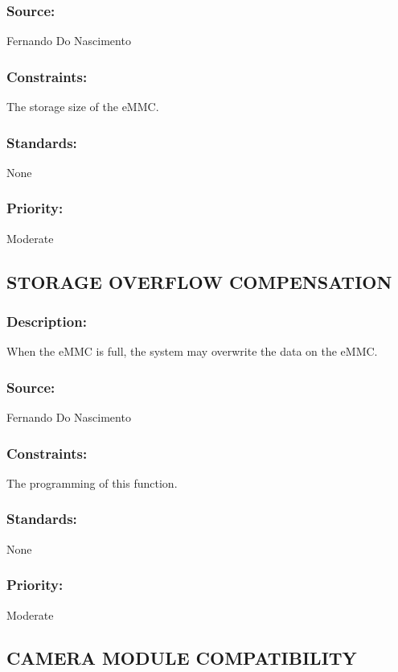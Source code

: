 \subsubsection{Source:} 
	{Fernando Do Nascimento}
\subsubsection{Constraints:} 
	{The storage size of the eMMC.}
\subsubsection{Standards:} 
	{None}
\subsubsection{Priority:} 
	{Moderate}
\newline
\newline
	
\subsection{\text STORAGE OVERFLOW COMPENSATION}
\subsubsection{Description:} 
	{When the eMMC is full, the system may overwrite the data on the eMMC.}
\subsubsection{Source:} 
	{Fernando Do Nascimento}
\subsubsection{Constraints:} 
	{The programming of this function.}
\subsubsection{Standards:} 
	{None}
\subsubsection{Priority:} 
	{Moderate}
\newline
\newline
	
\subsection{\text CAMERA MODULE COMPATIBILITY}
